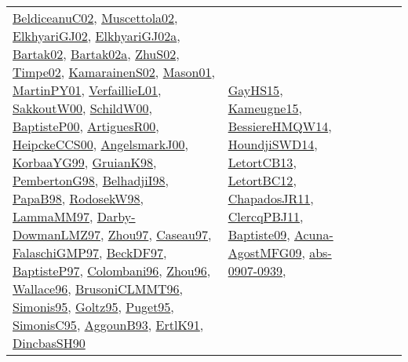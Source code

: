 {\begin{longtable}{lp{3cm}>{\raggedright}p{6cm}>{\raggedright}p{6cm}p{8cm}}
\href{papers/BeldiceanuC02.pdf}{BeldiceanuC02}\cite{BeldiceanuC02}, \href{papers/Muscettola02.pdf}{Muscettola02}\cite{Muscettola02}, \href{papers/ElkhyariGJ02.pdf}{ElkhyariGJ02}\cite{ElkhyariGJ02}, \href{papers/ElkhyariGJ02a.pdf}{ElkhyariGJ02a}\cite{ElkhyariGJ02a}, \href{papers/Bartak02.pdf}{Bartak02}\cite{Bartak02}, \href{papers/Bartak02a.pdf}{Bartak02a}\cite{Bartak02a}, \href{papers/ZhuS02.pdf}{ZhuS02}\cite{ZhuS02}, \href{articles/Timpe02.pdf}{Timpe02}\cite{Timpe02}, \href{papers/KamarainenS02.pdf}{KamarainenS02}\cite{KamarainenS02}, \href{articles/Mason01.pdf}{Mason01}\cite{Mason01}, \href{articles/MartinPY01.pdf}{MartinPY01}\cite{MartinPY01}, \href{papers/VerfaillieL01.pdf}{VerfaillieL01}\cite{VerfaillieL01}, \href{articles/SakkoutW00.pdf}{SakkoutW00}\cite{SakkoutW00}, \href{articles/SchildW00.pdf}{SchildW00}\cite{SchildW00}, \href{articles/BaptisteP00.pdf}{BaptisteP00}\cite{BaptisteP00}, \href{articles/ArtiguesR00.pdf}{ArtiguesR00}\cite{ArtiguesR00}, \href{articles/HeipckeCCS00.pdf}{HeipckeCCS00}\cite{HeipckeCCS00}, \href{papers/AngelsmarkJ00.pdf}{AngelsmarkJ00}\cite{AngelsmarkJ00}, \href{papers/KorbaaYG99.pdf}{KorbaaYG99}\cite{KorbaaYG99}, \href{papers/GruianK98.pdf}{GruianK98}\cite{GruianK98}, \href{papers/PembertonG98.pdf}{PembertonG98}\cite{PembertonG98}, \href{articles/BelhadjiI98.pdf}{BelhadjiI98}\cite{BelhadjiI98}, \href{articles/PapaB98.pdf}{PapaB98}\cite{PapaB98}, \href{papers/RodosekW98.pdf}{RodosekW98}\cite{RodosekW98}, \href{articles/LammaMM97.pdf}{LammaMM97}\cite{LammaMM97}, \href{articles/Darby-DowmanLMZ97.pdf}{Darby-DowmanLMZ97}\cite{Darby-DowmanLMZ97}, \href{articles/Zhou97.pdf}{Zhou97}\cite{Zhou97}, \href{papers/Caseau97.pdf}{Caseau97}\cite{Caseau97}, \href{articles/FalaschiGMP97.pdf}{FalaschiGMP97}\cite{FalaschiGMP97}, \href{papers/BeckDF97.pdf}{BeckDF97}\cite{BeckDF97}, \href{papers/BaptisteP97.pdf}{BaptisteP97}\cite{BaptisteP97}, \href{papers/Colombani96.pdf}{Colombani96}\cite{Colombani96}, \href{papers/Zhou96.pdf}{Zhou96}\cite{Zhou96}, \href{articles/Wallace96.pdf}{Wallace96}\cite{Wallace96}, \href{papers/BrusoniCLMMT96.pdf}{BrusoniCLMMT96}\cite{BrusoniCLMMT96}, \href{papers/Simonis95.pdf}{Simonis95}\cite{Simonis95}, \href{papers/Goltz95.pdf}{Goltz95}\cite{Goltz95}, \href{papers/Puget95.pdf}{Puget95}\cite{Puget95}, \href{papers/SimonisC95.pdf}{SimonisC95}\cite{SimonisC95}, \href{articles/AggounB93.pdf}{AggounB93}\cite{AggounB93}, \href{papers/ErtlK91.pdf}{ErtlK91}\cite{ErtlK91}, \href{articles/DincbasSH90.pdf}{DincbasSH90}\cite{DincbasSH90} & \href{papers/GayHS15.pdf}{GayHS15}\cite{GayHS15}, \href{articles/Kameugne15.pdf}{Kameugne15}\cite{Kameugne15}, \href{papers/BessiereHMQW14.pdf}{BessiereHMQW14}\cite{BessiereHMQW14}, \href{papers/HoundjiSWD14.pdf}{HoundjiSWD14}\cite{HoundjiSWD14}, \href{papers/LetortCB13.pdf}{LetortCB13}\cite{LetortCB13}, \href{papers/LetortBC12.pdf}{LetortBC12}\cite{LetortBC12}, \href{papers/ChapadosJR11.pdf}{ChapadosJR11}\cite{ChapadosJR11}, \href{papers/ClercqPBJ11.pdf}{ClercqPBJ11}\cite{ClercqPBJ11}, \href{papers/Baptiste09.pdf}{Baptiste09}\cite{Baptiste09}, \href{papers/Acuna-AgostMFG09.pdf}{Acuna-AgostMFG09}\cite{Acuna-AgostMFG09}, \href{articles/abs-0907-0939.pdf}{abs-0907-0939}\cite{abs-0907-0939}, 
\end{longtable}}
